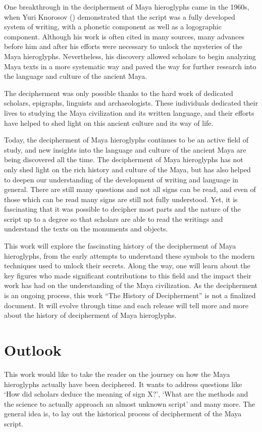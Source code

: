 \documentclass[../main.tex]{subfiles}
\begin{document}
One breakthrough in the decipherment of Maya hieroglyphs came in the 1960s, 
when Yuri Knorosov (\cite{knorozov1967}) demonstrated that the script was a fully developed 
system of writing, with a phonetic component as well as a logographic component. 
Although his work is often cited in many sources, many advances before him and after his efforts
were necessary to unlock the mysteries of the Maya hieroglyphs.
Nevertheless, his discovery allowed scholars to begin analyzing Maya texts in a more systematic 
way and paved the way for further research into the language and culture of the ancient Maya.

The decipherment was only possible thanks to the hard work of dedicated scholars, epigraphs, 
linguists and archaeologists. 
These individuals dedicated their lives to studying the Maya civilization and its written 
language, and their efforts have helped to shed light on this ancient culture and its way of life. 

Today, the decipherment of Maya hieroglyphs continues to be an active field of study, 
and new insights into the language and culture of the ancient Maya are being discovered 
all the time. 
The decipherment of Maya hieroglyphs has not only shed light on the rich history and culture of 
the Maya, but has also helped to deepen our understanding of the development of writing and 
language in general.
There are still many questions and not all signs can be read, and even of those which can be read
many signs are still not fully understood.
Yet, it is fascinating that it was possible to decipher most parts
and the nature of the script up to a degree so that scholars are able to read the writings and 
understand the texts on the monuments and objects.

This work will explore the fascinating history of the decipherment of Maya hieroglyphs, 
from the early attempts to understand these symbols to the modern techniques used to unlock 
their secrets. Along the way, one will learn about the key figures who made significant 
contributions to this field and the impact their work has had on the understanding of the 
Maya civilization.
As the decipherment is an ongoing process, this work ``The History of Decipherment'' is not a 
finalized document.
It will evolve through time and each release will tell more and more 
about the history of decipherment of Maya hieroglyphs.

\section{Outlook}
This work would like to take the reader on the journey on how the Maya hieroglyphs actually 
have been deciphered.
It wants to address questions like `How did scholars deduce the meaning of sign X?',
`What are the methods and the science to actually approach an almost unknown script' and many more.
The general idea is, to lay out the historical process of decipherment of the Maya script.
\end{document}
